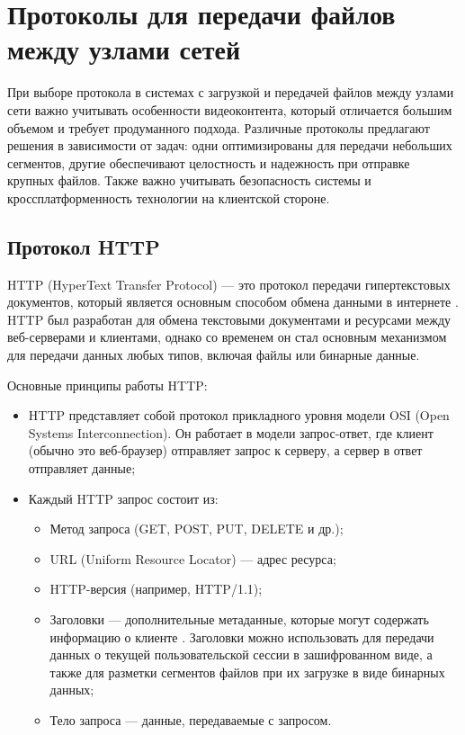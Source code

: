 \section{Протоколы для передачи файлов между узлами сетей}
	При выборе протокола в системах с загрузкой и передачей файлов между узлами сети важно учитывать особенности видеоконтента, который отличается большим объемом и требует продуманного подхода. Различные протоколы предлагают решения в зависимости от задач: одни оптимизированы для передачи небольших сегментов, другие обеспечивают целостность и надежность при отправке крупных файлов. Также важно учитывать безопасность системы и кроссплатформенность технологии на клиентской стороне.

\subsection{Протокол HTTP}
	HTTP (HyperText Transfer Protocol) — это протокол передачи гипертекстовых документов, который является основным способом обмена данными в интернете \cite{rfcHttp10}. HTTP был разработан для обмена текстовыми документами и ресурсами между веб-серверами и клиентами, однако со временем он стал основным механизмом для передачи данных любых типов, включая файлы или бинарные данные.
	
	Основные принципы работы HTTP:
	\begin{itemize}[label=$\bullet$]
		\item HTTP представляет собой протокол прикладного уровня модели OSI (Open Systems Interconnection). Он работает в модели запрос-ответ, где клиент (обычно это веб-браузер) отправляет запрос к серверу, а сервер в ответ отправляет данные;
		\item Каждый HTTP запрос состоит из:
		\begin{itemize}[label=$\circ$]
			\item Метод запроса (GET, POST, PUT, DELETE и др.);
			\item URL (Uniform Resource Locator) — адрес ресурса;
			\item HTTP-версия (например, HTTP/1.1);
			\item Заголовки — дополнительные метаданные, которые могут содержать информацию о клиенте \cite{gourleyHttpGuide}. Заголовки можно использовать для передачи данных о текущей пользовательской сессии в зашифрованном виде, а также для разметки сегментов файлов при их загрузке в виде бинарных данных;
			\item Тело запроса — данные, передаваемые с запросом.
		\end{itemize}
	\end{itemize}

